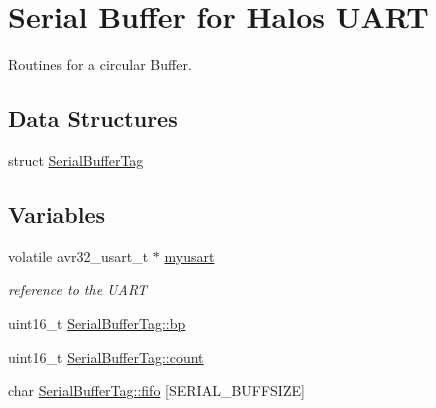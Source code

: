 \hypertarget{group__serialbuffer}{
\section{Serial Buffer for Halos UART}
\label{group__serialbuffer}
}
Routines for a circular Buffer.  


\subsection*{Data Structures}
\begin{CompactItemize}
\item 
struct \hyperlink{struct_serial_buffer_tag}{SerialBufferTag}
\end{CompactItemize}
\subsection*{Variables}
\begin{CompactItemize}
\item 
\hypertarget{group__serialbuffer_g6dd5e0e639beaa7c61014c923478b465}{
volatile avr32\_\-usart\_\-t $\ast$ \hyperlink{group__serialbuffer_g6dd5e0e639beaa7c61014c923478b465}{myusart}}
\label{group__serialbuffer_g6dd5e0e639beaa7c61014c923478b465}

\begin{CompactList}\small\item\em reference to the UART \item\end{CompactList}\item 
uint16\_\-t \hyperlink{group__serialbuffer_g80fec57b0c1089e49be601c8e154011f}{SerialBufferTag::bp}
\item 
uint16\_\-t \hyperlink{group__serialbuffer_gf764ad82a3af5651722c23326f28adbd}{SerialBufferTag::count}
\item 
char \hyperlink{group__serialbuffer_g0cbebf4bc14ed97a7d673795fccb8f26}{SerialBufferTag::fifo} \mbox{[}SERIAL\_\-BUFFSIZE\mbox{]}
\end{CompactItemize}
